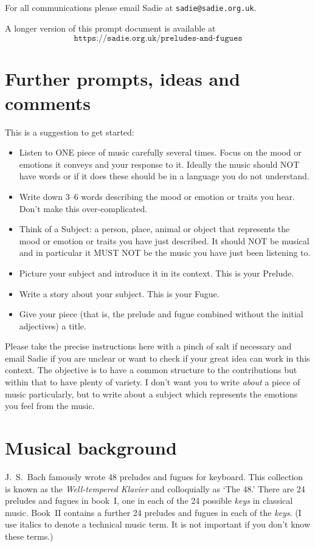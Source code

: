 \documentclass[a4paper]{article}
\begin{document}
For all communications please email Sadie at \texttt{sadie@sadie.org.uk}.

A longer version of this prompt document is available at\[
\texttt{https://sadie.org.uk/preludes-and-fugues}\]

\clearpage

\section{Further prompts, ideas and comments}

This is a suggestion to get started:
\begin{itemize}
\item Listen to ONE piece of music carefully several times.  Focus on
  the mood or emotions it conveys and your response to it. Ideally the
  music should NOT have words or if it does these should be in a
  language you do not understand.
\item Write down 3--6 words describing the mood or emotion or traits you hear.
  Don't make this over-complicated.
\item Think of a Subject: a person, place, animal or object that represents the
  mood or emotion or traits you have just described.  It should NOT be musical
  and in particular it MUST NOT be the music you have just been listening to.
\item Picture your subject and introduce it in its context.  This is your Prelude.
\item Write a story about your subject.  This is your Fugue.
\item Give your piece (that is, the prelude and fugue combined
without the initial adjectives) a title. 
\end{itemize}

Please take the precise instructions here with a pinch of salt if
necessary and email Sadie if you are unclear or want to check if your
great idea can work in this context.  The objective is to have a
common structure to the contributions but within that to have plenty
of variety. I don't want you to write \textit{about} a piece of music
particularly, but to write about a subject which represents the
emotions you feel from the music.

\section{Musical background}

J.~S.~Bach famously wrote 48 preludes and fugues for keyboard.  This
collection is known as the \textit{Well-tempered Klavier} and
colloquially as `The 48.' There are 24 preludes and fugues in book~I,
one in each of the 24 possible \textit{keys} in classical music.
Book~II contains a further 24 preludes and fugues in each of the
\textit{keys}.  (I use italics to denote a technical music term.  It
is not important if you don't know these terms.)
\end{document}

